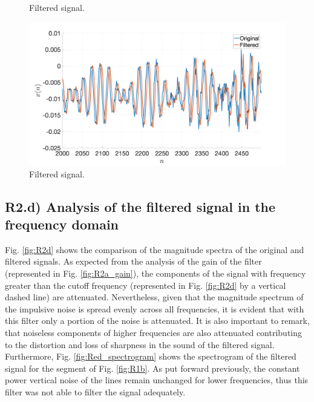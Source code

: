\documentclass[]{scrartcl}
\begin{document}
\begin{figure}[htbp]
\begin{minipage}[b]{.49\textwidth}
	\caption{Filtered signal.}
	\label{fig:R2c_zoomNoise}
\end{minipage}
\hfill
\begin{minipage}[b]{.49\textwidth}
	\centering
	\includegraphics[width= 1.1\textwidth]{figures/R2c_zoomNormal.png}
	\caption{Filtered signal.}
	\label{fig:R2c_zoomNormal}
\end{minipage}
\end{figure}

\subsection{R2.d) Analysis of the filtered signal in the frequency domain}
Fig. \ref{fig:R2d} shows the comparison of the magnitude spectra of the original and filtered signals. As expected from the analysis of the gain of the filter (represented in Fig. \ref{fig:R2a_gain}), the components of the signal with frequency greater than the cutoff frequency (represented in Fig. \ref{fig:R2d} by a vertical dashed line) are attenuated. Nevertheless, given that the magnitude spectrum of the impulsive noise is spread evenly across all frequencies, it is evident that with this filter only a portion of the noise is attenuated. It is also important to remark, that noiseless components of higher frequencies are also attenuated contributing to the distortion and loss of sharpness in the sound of the filtered signal. Furthermore, Fig. \ref{fig:Red_spectrogram} shows the spectrogram of the filtered signal for the segment of Fig. \ref{fig:R1b}. As put forward previously, the constant power vertical noise of the lines remain unchanged for lower frequencies, thus this filter was not able to filter the signal adequately.
\end{document}
